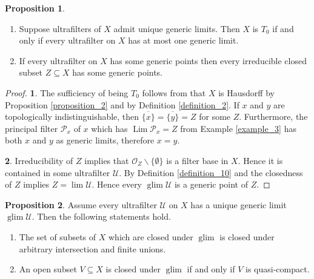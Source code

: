 \documentclass[10pt]{article}
\numberwithin{equation}{section}
\theoremstyle{definition}
\newtheorem{proposition}{Proposition}[subsection]
\DeclareMathOperator{\Lim}{Lim}
\DeclareMathOperator{\glim}{glim}
\newcommand{\Ouv}{\mathscr{O}}
\newcommand{\U}[0]{\mathcal{U}}
\begin{document}
\begin{proposition}$\:$
    \label{fact_14_a}
    \begin{enumerate}[1.]
        \item Suppose ultrafilters of $X$ admit unique generic limits. Then $X$ is $T_0$ if and only if every ultrafilter on $X$ has at most one generic limit.
        \item If every ultrafilter on $X$ has some generic points then every irreducible closed subset $Z\subseteq X$ has some generic points.
    \end{enumerate}
\end{proposition}
\begin{proof}
    \textbf{1}. The sufficiency of being $T_0$ follows from that $X$ is Hausdorff by Proposition \ref{proposition_2} and by Definition \ref{definition_2}. If $x$ and $y$ are topologically indistinguishable, then $\overline{\{x\}} = \overline{\{y\}} =Z$ for some $Z$. Furthermore, the principal filter $\mathcal{P}_x$ of $x$ which has $\Lim\mathcal{P}_x = Z$ from Example \ref{example_3} has both $x$ and $y$ as generic limits, therefore $x=y$.
    \par \textbf{2}. Irreducibility of $Z$ implies that $\Ouv_Z\backslash\{\emptyset\}$ is a filter base in $X$. Hence it is contained in some ultrafilter $\U$. By Definition \ref{definition_10} and the closedness of $Z$ implies $Z=\lim\U$. Hence every $\glim\U$ is a generic point of $Z$.
\end{proof}
\begin{proposition}
    \label{fact_14_b}
    Assume every ultrafilter $\U$ on $X$ has a unique generic limit $\glim\U$. Then the following statements hold.
    \begin{enumerate}[1.]
        \item  The set of subsets of $X$ which are closed under $\glim$ is closed under arbitrary intersection and finite unions.
        \item An open subset $V\subseteq X$ is closed under $\glim$ if and only if $V$ is quasi-compact.
    \end{enumerate}
\end{proposition}
\end{document}
